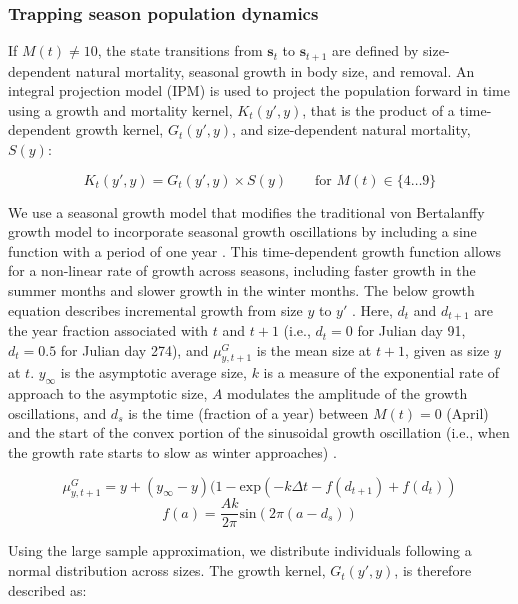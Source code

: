 \documentclass{article}
\begin{document}
\subsubsection{Trapping season population dynamics}

If $M(t)\neq 10$, the state transitions from $\textbf{s}_t$ to $\textbf{s}_{t+1}$ are defined by size-dependent natural mortality, seasonal growth in body size, and removal. An integral projection model (IPM) is used to project the population forward in time using a growth and mortality kernel, $K_t(y',y)$, that is the product of a time-dependent growth kernel, $G_t(y',y)$, and size-dependent natural mortality, $S(y)$:

\begin{equation}
K_t(y',y) = G_t(y',y) \times S(y) \qquad \text{for } M(t) \in \{4\dots9\}
\end{equation}

We use a seasonal growth model that modifies the traditional von Bertalanffy growth model to incorporate seasonal growth oscillations by including a sine function with a period of one year \parencite{beverton2012dynamics, somers1988seasonally}. This time-dependent growth function allows for a non-linear rate of growth across seasons, including faster growth in the summer months and slower growth in the winter months. The below growth equation describes incremental growth from size $y$ to $y'$ \parencite{white2016fitting}. Here, $d_t$ and $d_{t+1}$ are the year fraction associated with $t$ and $t+1$ (i.e., $d_t = 0$ for Julian day 91, $d_t = 0.5$ for Julian day 274), and $\mu^G_{y,t+1}$ is the mean size at $t+1$, given as size $y$ at $t$. $y_{\infty}$ is the asymptotic average size, $k$ is a measure of the exponential rate of approach to the asymptotic size, $A$ modulates the amplitude of the growth oscillations, and $d_s$ is the time (fraction of a year) between $M(t) = 0$ (April) and the start of the convex portion of the sinusoidal growth oscillation (i.e., when the growth rate starts to slow as winter approaches) \parencite{garcia2012technical}.

\begin{equation}
\mu^G_{y,t+1} = y + (y_{\infty}-y)(1-\text{exp}(-k\Delta t-f(d_{t+1})+f(d_t))
\end{equation}
\begin{equation}
f(a) = \frac{Ak}{2\pi} \text{sin}(2\pi(a-d_s)) 
\end{equation}

Using the large sample approximation, we distribute individuals following a normal distribution across sizes. The growth kernel, $G_t(y',y)$, is therefore described as:
\end{document}
